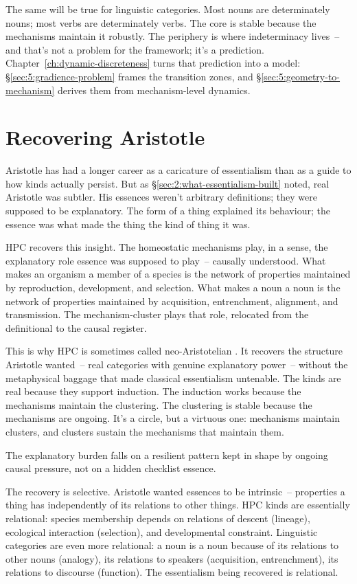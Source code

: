 The same will be true for linguistic categories. Most nouns are determinately nouns; most verbs are determinately verbs. The core is stable because the mechanisms maintain it robustly. The periphery is where indeterminacy lives~-- and that's not a problem for the framework; it's a prediction. Chapter~\ref{ch:dynamic-discreteness} turns that prediction into a model: §\ref{sec:5:gradience-problem} frames the transition zones, and §\ref{sec:5:geometry-to-mechanism} derives them from mechanism-level dynamics.


\section{Recovering Aristotle}
\label{sec:4:aristotle}

Aristotle has had a longer career as a caricature of essentialism than as a guide to how kinds actually persist. But as §\ref{sec:2:what-essentialism-built} noted, real Aristotle was subtler. His essences weren't arbitrary definitions; they were supposed to be explanatory. The form of a thing explained its behaviour; the essence was what made the thing the kind of thing it was.

HPC recovers this insight. The homeostatic mechanisms play, in a sense, the explanatory role essence was supposed to play~-- causally understood. What makes an organism a member of a species is the network of properties maintained by reproduction, development, and selection. What makes a noun a noun is the network of properties maintained by acquisition, entrenchment, alignment, and transmission. The mechanism-cluster plays that role, relocated from the definitional to the causal register.

This is why HPC is sometimes called neo-Aristotelian \citep{boyd1999,wilson1999}. It recovers the structure Aristotle wanted~-- real categories with genuine explanatory power~-- without the metaphysical baggage that made classical essentialism untenable. The kinds are real because they support induction. The induction works because the mechanisms maintain the clustering. The clustering is stable because the mechanisms are ongoing. It's a circle, but a virtuous one: mechanisms maintain clusters, and clusters sustain the mechanisms that maintain them.

The explanatory burden falls on a resilient pattern kept in shape by ongoing causal pressure, not on a hidden checklist essence.

The recovery is selective. Aristotle wanted essences to be intrinsic~-- properties a thing has independently of its relations to other things. HPC kinds are essentially relational: species membership depends on relations of descent (lineage), ecological interaction (selection), and developmental constraint. Linguistic categories are even more relational: a noun is a noun because of its relations to other nouns (analogy), its relations to speakers (acquisition, entrenchment), its relations to discourse (function). The essentialism being recovered is relational.

